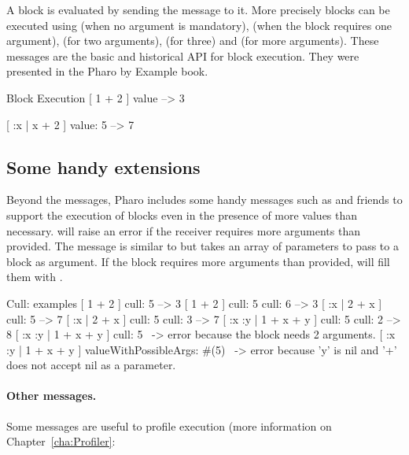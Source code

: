 \documentclass[a4paper,10pt,twoside]{book}
\begin{document}
 A block is evaluated by sending the  message to it. More precisely blocks can be executed using  (when no argument is mandatory),  (when the block requires one argument),  (for two arguments),  (for three) and  (for more arguments). These messages are the basic and historical API for block execution. They were presented in the Pharo by Example book.

\begin{code}{Block Execution}
[ 1 + 2 ] value --> 3

[ :x | x + 2 ] value: 5 --> 7
\end{code}

\subsection{Some handy extensions}

Beyond the  messages, Pharo includes some handy messages
such as  and friends to support the execution of blocks even
in the presence of more values than necessary.  will raise
an error if the receiver requires more arguments than provided. The
 message is similar to  but takes
an array of parameters to pass to a block as argument. If the block
requires more arguments than provided, 
will fill them with .

\begin{code}{Cull: examples}
[ 1 + 2 ] cull: 5 --> 3
[ 1 + 2 ] cull: 5 cull: 6 --> 3
[ :x | 2 + x ] cull: 5 --> 7
[ :x | 2 + x ] cull: 5 cull: 3 --> 7
[ :x :y | 1 + x + y ] cull: 5 cull: 2 --> 8
[ :x :y | 1 + x + y ] cull: 5 ~-> error because the block needs 2 arguments.
[ :x :y | 1 + x + y ] valueWithPossibleArgs: #(5)
                      ~-> error because 'y' is nil and '+' does not accept nil as a parameter.
\end{code}


\paragraph{Other messages.}

Some messages are useful to profile execution (more information on Chapter~\ref{cha:Profiler}:
\end{document}
